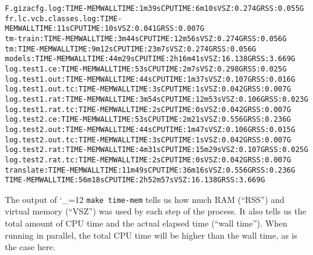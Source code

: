 \documentclass[11pt,letterpaper]{article}
\def\code{\begingroup\catcode`\_=12 \codex}
\newcommand{\codex}[1]{\texttt{#1}\endgroup}
\begin{document}
\begin{tiny}
\begin{alltt}
            F.gizacfg.log:TIME-MEM                            WALL TIME: 1m39s    CPU TIME: 6m10s      VSZ: 0.274G    RSS: 0.055G
            fr.lc.vcb.classes.log:TIME-MEM                    WALL TIME: 11s      CPU TIME: 10s        VSZ: 0.041G    RSS: 0.007G
         tm-train:TIME-MEM                                    WALL TIME: 3m44s    CPU TIME: 12m56s     VSZ: 0.274G    RSS: 0.056G
      tm:TIME-MEM                                             WALL TIME: 9m12s    CPU TIME: 23m7s      VSZ: 0.274G    RSS: 0.056G
   models:TIME-MEM                                            WALL TIME: 44m29s   CPU TIME: 2h16m41s   VSZ: 16.138G   RSS: 3.669G
      log.test1.ce:TIME-MEM                                   WALL TIME: 53s      CPU TIME: 2m7s       VSZ: 0.298G    RSS: 0.025G
      log.test1.out:TIME-MEM                                  WALL TIME: 44s      CPU TIME: 1m37s      VSZ: 0.107G    RSS: 0.016G
      log.test1.out.tc:TIME-MEM                               WALL TIME: 3s       CPU TIME: 1s         VSZ: 0.042G    RSS: 0.007G
      log.test1.rat:TIME-MEM                                  WALL TIME: 3m54s    CPU TIME: 12m53s     VSZ: 0.106G    RSS: 0.023G
      log.test1.rat.tc:TIME-MEM                               WALL TIME: 2s       CPU TIME: 0s         VSZ: 0.042G    RSS: 0.007G
      log.test2.ce:TIME-MEM                                   WALL TIME: 53s      CPU TIME: 2m21s      VSZ: 0.556G    RSS: 0.236G
      log.test2.out:TIME-MEM                                  WALL TIME: 44s      CPU TIME: 1m47s      VSZ: 0.106G    RSS: 0.015G
      log.test2.out.tc:TIME-MEM                               WALL TIME: 3s       CPU TIME: 1s         VSZ: 0.042G    RSS: 0.007G
      log.test2.rat:TIME-MEM                                  WALL TIME: 4m31s    CPU TIME: 15m29s     VSZ: 0.107G    RSS: 0.025G
      log.test2.rat.tc:TIME-MEM                               WALL TIME: 2s       CPU TIME: 0s         VSZ: 0.042G    RSS: 0.007G
   translate:TIME-MEM                                         WALL TIME: 11m49s   CPU TIME: 36m16s     VSZ: 0.556G    RSS: 0.236G
TIME-MEM                                                      WALL TIME: 56m18s   CPU TIME: 2h52m57s   VSZ: 16.138G   RSS: 3.669G
\end{alltt}
\end{tiny}

The output of \code{make time-mem} tells us how much RAM (``RSS'') and
virtual memory (``VSZ'') was used by each step of the process. It also tells us
the total amount of CPU time and the actual elapsed time (``wall time'').  When
running in parallel, the total CPU time will be higher than the wall time, as is
the case here.
\end{document}

